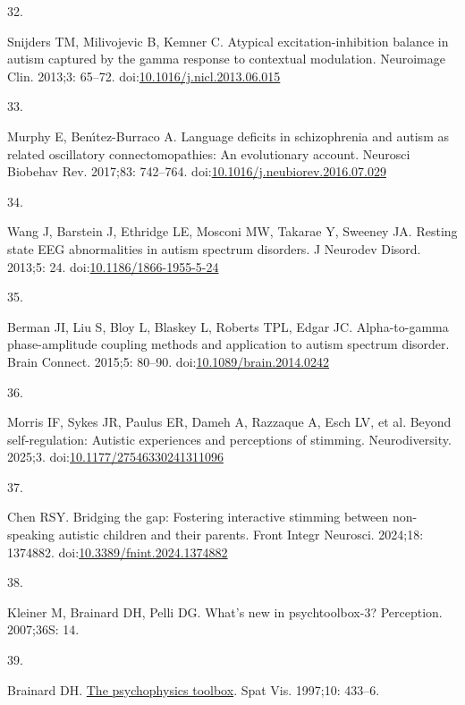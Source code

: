 \documentclass[
  letterpaper,
  DIV=11,
  numbers=noendperiod]{scrartcl}
\newlength{\cslhangindent}
\newlength{\csllabelwidth}
\newenvironment{CSLReferences}[2] %
 {\begin{list}{}{%
  \setlength{\itemindent}{0pt}
  \setlength{\leftmargin}{0pt}
  \setlength{\parsep}{0pt}
  \ifodd #1
   \setlength{\leftmargin}{\cslhangindent}
   \setlength{\itemindent}{-1\cslhangindent}
  \fi
  \setlength{\itemsep}{#2\baselineskip}}}
 {\end{list}}
\newcommand{\CSLLeftMargin}[1]{\parbox[t]{\csllabelwidth}{\strut#1\strut}}
\newcommand{\CSLRightInline}[1]{\parbox[t]{\linewidth - \csllabelwidth}{\strut#1\strut}}
\begin{document}
\begin{CSLReferences}{0}{1}
\CSLLeftMargin{32. }%
\CSLRightInline{Snijders TM, Milivojevic B, Kemner C. Atypical
excitation-inhibition balance in autism captured by the gamma response
to contextual modulation. Neuroimage Clin. 2013;3: 65--72.
doi:\href{https://doi.org/10.1016/j.nicl.2013.06.015}{10.1016/j.nicl.2013.06.015}}

\CSLLeftMargin{33. }%
\CSLRightInline{Murphy E, Benı́tez-Burraco A. Language deficits in
schizophrenia and autism as related oscillatory connectomopathies: An
evolutionary account. Neurosci Biobehav Rev. 2017;83: 742--764.
doi:\href{https://doi.org/10.1016/j.neubiorev.2016.07.029}{10.1016/j.neubiorev.2016.07.029}}

\CSLLeftMargin{34. }%
\CSLRightInline{Wang J, Barstein J, Ethridge LE, Mosconi MW, Takarae Y,
Sweeney JA. Resting state EEG abnormalities in autism spectrum
disorders. J Neurodev Disord. 2013;5: 24.
doi:\href{https://doi.org/10.1186/1866-1955-5-24}{10.1186/1866-1955-5-24}}

\CSLLeftMargin{35. }%
\CSLRightInline{Berman JI, Liu S, Bloy L, Blaskey L, Roberts TPL, Edgar
JC. Alpha-to-gamma phase-amplitude coupling methods and application to
autism spectrum disorder. Brain Connect. 2015;5: 80--90.
doi:\href{https://doi.org/10.1089/brain.2014.0242}{10.1089/brain.2014.0242}}

\CSLLeftMargin{36. }%
\CSLRightInline{Morris IF, Sykes JR, Paulus ER, Dameh A, Razzaque A,
Esch LV, et al. Beyond self-regulation: Autistic experiences and
perceptions of stimming. Neurodiversity. 2025;3.
doi:\href{https://doi.org/10.1177/27546330241311096}{10.1177/27546330241311096}}

\CSLLeftMargin{37. }%
\CSLRightInline{Chen RSY. Bridging the gap: Fostering interactive
stimming between non-speaking autistic children and their parents. Front
Integr Neurosci. 2024;18: 1374882.
doi:\href{https://doi.org/10.3389/fnint.2024.1374882}{10.3389/fnint.2024.1374882}}

\CSLLeftMargin{38. }%
\CSLRightInline{Kleiner M, Brainard DH, Pelli DG. What's new in
psychtoolbox-3? Perception. 2007;36S: 14. }

\CSLLeftMargin{39. }%
\CSLRightInline{Brainard DH.
\href{https://www.ncbi.nlm.nih.gov/pubmed/9176952}{The psychophysics
toolbox}. Spat Vis. 1997;10: 433--6. }


\end{CSLReferences}
\end{document}

